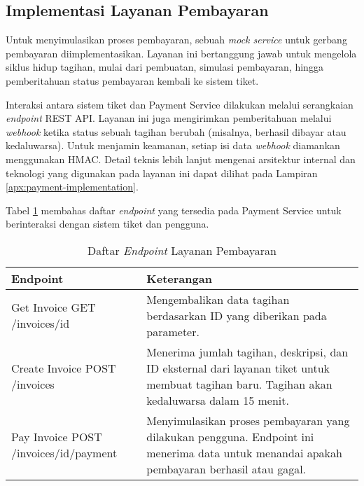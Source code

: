 \subsection{Implementasi Layanan Pembayaran}

Untuk menyimulasikan proses pembayaran, sebuah \textit{mock service} untuk gerbang pembayaran diimplementasikan. Layanan ini bertanggung jawab untuk mengelola siklus hidup tagihan, mulai dari pembuatan, simulasi pembayaran, hingga pemberitahuan status pembayaran kembali ke sistem tiket.

Interaksi antara sistem tiket dan Payment Service dilakukan melalui serangkaian \textit{endpoint} REST API. Layanan ini juga mengirimkan pemberitahuan melalui \textit{webhook} ketika status sebuah tagihan berubah (misalnya, berhasil dibayar atau kedaluwarsa). Untuk menjamin keamanan, setiap isi data \textit{webhook} diamankan menggunakan HMAC. Detail teknis lebih lanjut mengenai arsitektur internal dan teknologi yang digunakan pada layanan ini dapat dilihat pada Lampiran \ref{apx:payment-implementation}.

Tabel \ref{table:payment-endpoint} membahas daftar \textit{endpoint} yang tersedia pada Payment Service untuk berinteraksi dengan sistem tiket dan pengguna.

\begin{table}[h!]
    \centering
    \caption{Daftar \textit{Endpoint} Layanan Pembayaran}
    \label{table:payment-endpoint}
    \begin{tabular}{|p{}|p{}|}
        \hline
        \textbf{Endpoint}                                & \textbf{Keterangan}                                                                                                                          \\
        \hline
        Get Invoice \newline GET /invoices/{id}          & Mengembalikan data tagihan berdasarkan ID yang diberikan pada parameter.                                                                     \\
        \hline
        Create Invoice \newline POST /invoices           & Menerima jumlah tagihan, deskripsi, dan ID eksternal dari layanan tiket untuk membuat tagihan baru. Tagihan akan kedaluwarsa dalam 15 menit. \\
        \hline
        Pay Invoice \newline POST /invoices/{id}/payment & Menyimulasikan proses pembayaran yang dilakukan pengguna. Endpoint ini menerima data untuk menandai apakah pembayaran berhasil atau gagal.   \\
        \hline
    \end{tabular}
\end{table}
